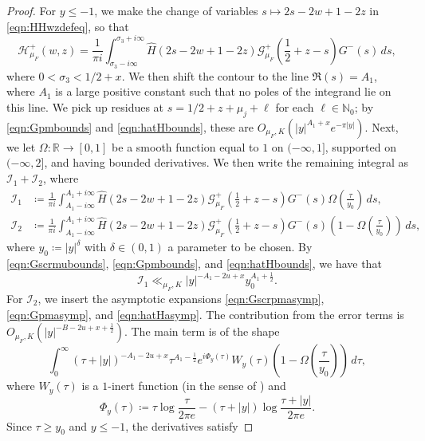 \documentclass[11pt,a4paper]{amsart}
\newcommand{\Gscr}{\mathscr{G}}
\newcommand{\HH}{\mathcal{H}}
\newcommand{\II}{\mathcal{I}}
\newcommand{\N}{\mathbb{N}}
\newcommand{\R}{\mathbb{R}}
\numberwithin{equation}{section}
\theoremstyle{remark}
\theoremstyle{definition}
\begin{document}
\begin{proof}
For $y \leq -1$, we make the change of variables $s \mapsto 2s - 2w + 1 - 2z$ in \eqref{eqn:HHwzdefeq}, so that
\[\HH_{\mu_F}^{+}(w,z) = \frac{1}{\pi i} \int_{\sigma_3 - i\infty}^{\sigma_3 + i\infty} \widehat{H}(2s - 2w + 1 - 2z) \Gscr_{\mu_F}^{+}\left(\frac{1}{2} + z - s\right) G^{-}(s) \, ds,\]
where $0 < \sigma_3 < 1/2 + x$. We then shift the contour to the line $\Re(s) = A_1$, where $A_1$ is a large positive constant such that no poles of the integrand lie on this line. We pick up residues at $s = 1/2 + z + \mu_j + \ell$ for each $\ell \in \N_0$; by \eqref{eqn:Gpmbounds} and \eqref{eqn:hatHbounds}, these are $O_{\mu_F,K}(|y|^{A_1 + x} e^{-\pi |y|})$. Next, we let $\Omega : \R \to [0,1]$ be a smooth function equal to $1$ on $(-\infty,1]$, supported on $(-\infty,2]$, and having bounded derivatives. We then write the remaining integral as $\II_1 + \II_2$, where
\begin{align*}
\II_1 & \coloneqq \frac{1}{\pi i} \int_{A_1 - i\infty}^{A_1 + i\infty} \widehat{H}(2s - 2w + 1 - 2z) \Gscr_{\mu_F}^{+}\left(\frac{1}{2} + z - s\right) G^{-}(s) \Omega\left(\frac{\tau}{y_0}\right) \, ds,	\\
\II_2 & \coloneqq \frac{1}{\pi i} \int_{A_1 - i\infty}^{A_1 + i\infty} \widehat{H}(2s - 2w + 1 - 2z) \Gscr_{\mu_F}^{+}\left(\frac{1}{2} + z - s\right) G^{-}(s) \left(1 - \Omega\left(\frac{\tau}{y_0}\right)\right) \, ds,
\end{align*}
where $y_0 \coloneqq |y|^{\delta}$ with $\delta \in (0,1)$ a parameter to be chosen. By \eqref{eqn:Gscrmubounds}, \eqref{eqn:Gpmbounds}, and \eqref{eqn:hatHbounds}, we have that
\[\II_1 \ll_{\mu_F,K} |y|^{-A_1 - 2u + x} y_0^{A_1 + \frac{1}{2}}.\]
For $\II_2$, we insert the asymptotic expansions \eqref{eqn:Gscrpmasymp}, \eqref{eqn:Gpmasymp}, and \eqref{eqn:hatHasymp}. The contribution from the error terms is $O_{\mu_F,K}(|y|^{- B - 2u + x + \frac{1}{2}})$. The main term is of the shape
\begin{equation}
\label{eqn:II2mainterm}
\int_{0}^{\infty} (\tau + |y|)^{-A_1 - 2u + x} \tau^{A_1 - \frac{1}{2}} e^{i\Phi_y(\tau)} W_y(\tau) \left(1 - \Omega\left(\frac{\tau}{y_0}\right)\right) \, d\tau,
\end{equation}
where $W_y(\tau)$ is a $1$-inert function (in the sense of \cite[Definition 2.1]{KPY19}) and
\begin{equation}
\label{eqn:Phiytaudefeq}
\Phi_y(\tau) \coloneqq \tau \log \frac{\tau}{2\pi e} - (\tau + |y|) \log \frac{\tau + |y|}{2\pi e}.
\end{equation}
Since $\tau \geq y_0$ and $y \leq -1$, the derivatives satisfy

\end{proof}
\end{document}
